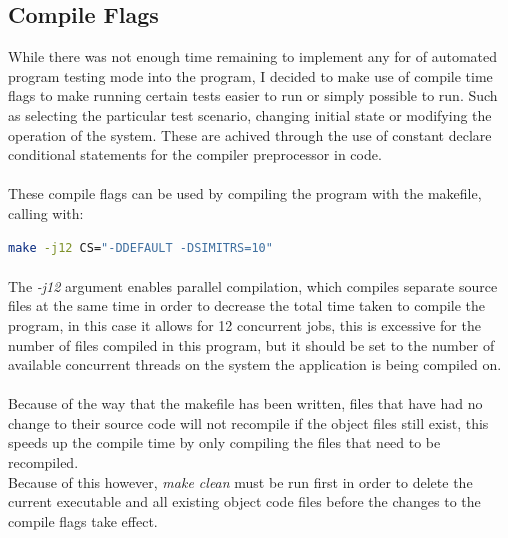 \subsection{Compile Flags}
While there was not enough time remaining to implement any for of automated program testing mode into the program, I decided to make use of compile time flags to make running certain tests easier to run or simply possible to run. Such as selecting the particular test scenario, changing initial state or modifying the operation of the system. These are achived through the use of constant declare conditional statements for the compiler preprocessor in code.

\paragraph{}
These compile flags can be used by compiling the program with the makefile, calling with:
\begin{lstlisting}[language=bash]
  make -j12 CS="-DDEFAULT -DSIMITRS=10"
\end{lstlisting}
\paragraph{}
The \textit{-j12} argument enables parallel compilation, which compiles separate source files at the same time in order to decrease the total time taken to compile the program, in this case it allows for 12 concurrent jobs, this is excessive for the number of files compiled in this program, but it should be set to the number of available concurrent threads on the system the application is being compiled on.

\paragraph{}
Because of the way that the makefile has been written, files that have had no change to their source code will not recompile if the object files still exist, this speeds up the compile time by only compiling the files that need to be recompiled. \\
Because of this however, \textit{make clean} must be run first in order to delete the current executable and all existing object code files before the changes to the compile flags take effect.

